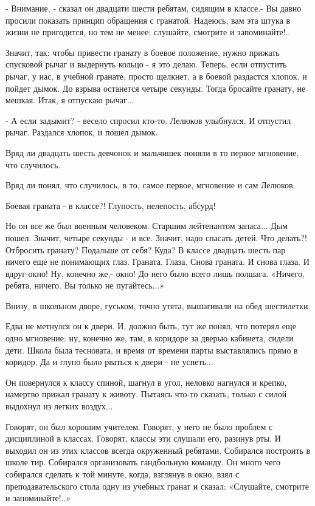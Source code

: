 - Внимание, - сказал он двадцати шести ребятам, сидящим в классе.- Вы давно
просили показать принцип обращения с гранатой. Надеюсь, вам эта штука в жизни
не пригодится, но тем не менее: слушайте, смотрите и запоминайте!..

Значит, так: чтобы привести гранату в боевое положение, нужно прижать спусковой
рычаг и выдернуть кольцо - я это делаю. Теперь, если отпустить рычаг, у нас, в
учебной гранате, просто щелкнет, а в боевой раздастся хлопок, и пойдет дымок.
До взрыва останется четыре секунды. Тогда бросайте гранату, не мешкая. Итак, я
отпускаю рычаг...

- А если задымит? - весело спросил кто-то.
Лелюков улыбнулся. И отпустил рычаг. Раздался хлопок, и пошел дымок.

Вряд ли двадцать шесть девчонок и мальчишек поняли в то первое мгновение, что случилось.

Вряд ли понял, что случилось, в то, самое первое, мгновение и сам Лелюков.

Боевая граната - в классе?! Глупость, нелепость, абсурд!

Но он все же был военным человеком. Старшим лейтенантом запаса... Дым пошел.
Значит, четыре секунды - и все. Значит, надо спасать детей. Что делать?!
Отбросить гранату? Подальше от себя? Куда? В классе двадцать шесть пар ничего
еще не понимающих глаз. Граната. Глаза. Снова граната. И снова глаза. И
вдруг-окно! Ну, конечно же,- окно! До него было всего лишь полшага. «Ничего,
ребята, ничего. Вы только не пугайтесь...»

Внизу, в школьном дворе, гуськом, точно утята, вышагивали на обед шестилетки.

Едва не метнулся он к двери. И, должно быть, тут же понял, что потерял еще одно
мгновение: ну, конечно же, там, в коридоре за дверью кабинета, сидели дети.
Школа была тесновата, и время от времени парты выставлялись прямо в коридор. Да
и глупо было рваться к двери - не успеть...

Он повернулся к классу спиной, шагнул в угол, неловко нагнулся и крепко,
намертво прижал гранату к животу. Пытаясь что-то сказать, только с силой
выдохнул из легких воздух...

Говорят, он был хорошим учителем. Говорят, у него не было проблем с дисциплиной
в классах. Говорят, классы эти слушали его, разинув рты. И выходил он из этих
классов всегда окруженный ребятами. Собирался построить в школе тир. Собирался
организовать гандбольную команду. Он много чего собирался сделать к той минуте,
когда, взглянув в окно, взял с преподавательского стола одну из учебных гранат
и сказал: «Слушайте, смотрите и запоминайте!..»

